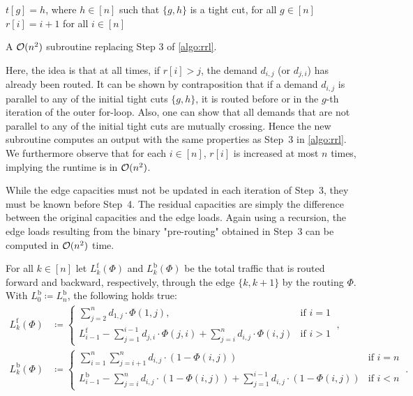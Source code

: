 \begin{algorithm}[H]
	\begin{mdframed}[backgroundcolor=green!10,linecolor=white,innerleftmargin=25pt,leftmargin=-25pt,rightmargin=15pt]
		$t[g] = h$, where $h \in [n]$ such that $\{g, h\}$ is a tight cut, for all $g \in [n]$\;
		$r[i] = i+1$ for all $i \in [n]$\;
	\end{mdframed}
	\caption{A $\mathcal{O}(n^2)$ subroutine replacing Step 3 of \cref{algo:rrl}.}
	\label{algo:step3}
\end{algorithm}
Here, the idea is that at all times, if $r[i] > j$, the demand $d_{i,j}$ (or $d_{j, i}$) has already been routed.
It can be shown by contraposition that if a demand $d_{i,j}$ is parallel to any of the initial tight cuts $\{g, h\}$, it is routed before or in the $g$-th iteration of the outer for-loop.
Also, one can show that all demands that are not parallel to any of the initial tight cuts are mutually crossing.
Hence the new subroutine computes an output with the same properties as Step~3 in \cref{algo:rrl}.
We furthermore observe that for each $i \in [n]$, $r[i]$ is increased at most $n$ times, implying the runtime is in $\mathcal{O}(n^2)$.

While the edge capacities must not be updated in each iteration of Step~3, they must be known before Step~4.
The residual capacities are simply the difference between the original capacities and the edge loads.
Again using a recursion, the edge loads resulting from the binary "pre-routing" obtained in Step~3 can be computed in $\mathcal{O}(n^2)$ time.

\begin{lemma}
	\label{lemma:link-loads}
	For all $k \in [n]$ let $L_k^\mathrm{f}(\Phi)$ and $L_k^\mathrm{b}(\Phi)$ be the total traffic that is routed forward and backward, respectively, through the edge $\{k, k+1\}$ by the routing $\Phi$. 
	With $L_0^\mathrm{b} \coloneqq L_n^\mathrm{b}$, the following holds true:
		\begin{align}
		L_k^\mathrm{f}(\Phi) &\coloneqq \begin{cases}
			\sum_{j = 2}^n d_{1,j} \cdot \Phi(1, j), & \text{if } i = 1 \\
			L_{i-1}^\mathrm{f} - \sum_{j = 1}^{i-1} d_{j,i} \cdot \Phi(j, i) + \sum_{j = i}^{n} d_{i,j} \cdot \Phi(i, j) & \text{if } i > 1
		\end{cases} \ , \\
		L_k^\mathrm{b}(\Phi) &\coloneqq \begin{cases}
			\sum_{i = 1}^n \sum_{j = i+1}^n d_{i,j} \cdot (1 - \Phi(i, j)) & \text{if } i = n\\
			L_{i-1}^\mathrm{b} - \sum_{j = i}^{n} d_{i, j} \cdot (1 - \Phi(i, j)) + \sum_{j = 1}^{i-1} d_{i,j} \cdot(1 - \Phi(i, j)) & \text{if } i < n
		\end{cases} \ .
	\end{align}
\end{lemma}

